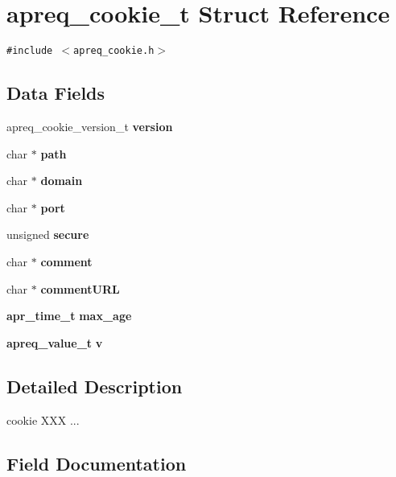 \section{apreq\_\-cookie\_\-t Struct Reference}
\label{structapreq__cookie__t}
{\tt \#include $<$apreq\_\-cookie.h$>$}

\subsection*{Data Fields}
\begin{CompactItemize}
\item 
apreq\_\-cookie\_\-version\_\-t {\bf version}
\item 
char $\ast$ {\bf path}\label{structapreq__cookie__t_m1}

\item 
char $\ast$ {\bf domain}\label{structapreq__cookie__t_m2}

\item 
char $\ast$ {\bf port}\label{structapreq__cookie__t_m3}

\item 
unsigned {\bf secure}\label{structapreq__cookie__t_m4}

\item 
char $\ast$ {\bf comment}\label{structapreq__cookie__t_m5}

\item 
char $\ast$ {\bf comment\-URL}\label{structapreq__cookie__t_m6}

\item 
{\bf apr\_\-time\_\-t} {\bf max\_\-age}
\item 
{\bf apreq\_\-value\_\-t} {\bf v}
\end{CompactItemize}


\subsection{Detailed Description}
cookie XXX ... 



\subsection{Field Documentation}
